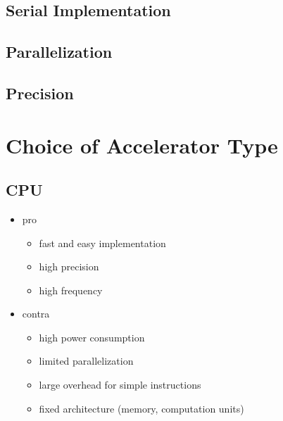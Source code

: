 \documentclass[mscthesis]{usiinfthesis}
\begin{document}
\subsection{Serial Implementation}




\subsection{Parallelization}

\subsection{Precision}


\section{Choice of Accelerator Type}

\subsection{CPU}
\begin{itemize}
    \item pro
    \begin{itemize}
        \item fast and easy implementation
        \item high precision
        \item high frequency
    \end{itemize}
    \item contra
    \begin{itemize}
        \item high power consumption
        \item limited parallelization
        \item large overhead for simple instructions
        \item fixed architecture (memory, computation units)
    \end{itemize}
\end{itemize}
\end{document}
